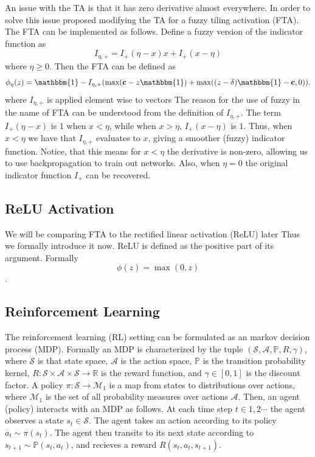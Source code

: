 \documentclass{article}
\newcommand{\RR}{\mathbb{R}}
\newcommand{\PP}{\mathbb{P}}
\newcommand{\cS}{\mathcal{S}}
\newcommand{\cA}{\mathcal{A}}
\newcommand{\cM}{\mathcal{M}}
\begin{document}
An issue with the TA is that it has zero derivative almost everywhere.
In order to solve this issue \cite{pan2019fuzzy} proposed modifying the TA for a fuzzy tiling activation (FTA).
The FTA can be implemented as follows.
Define a fuzzy version of the indicator function as 
$$I_{\eta, +} = I_+(\eta -x)x + I_+(x - \eta)$$
where $\eta \ge 0$.
Then the FTA can be defined as
$$\phi_\eta(z) = \mathbbm{1} - I_{\eta, +} (\max(\mathbf{c} - z \mathbbm{1}) + \max((z-\delta)\mathbbm{1} - \mathbf{c}, 0)).$$
where $I_{\eta, +}$ is applied element wise to vectors
The reason for the use of fuzzy in the name of FTA can be understood from the definition of $I_{\eta, +}$.
The term $I_+(\eta -x)$ is $1$ when $x < \eta$, while when $x > \eta$, $I_+(x - \eta)$ is $1$.
Thus, when $x < \eta$ we have that $I_{\eta ,+}$ evaluates to $x$, giving a smoother (fuzzy) indicator function.
Notice, that this means for $x < \eta$ the derivative is non-zero, allowing us to use backpropagation to train out networks.
Also, when $\eta = 0$ the original indicator function $I_+$ can be recovered.

\subsection{ReLU Activation}
We will be comparing FTA to the rectified linear activation (ReLU) later 
Thus we formally introduce it now.
ReLU is defined as the positive part of its argument. Formally
$$\phi(z) = \max(0, z)$$.

\subsection{Reinforcement Learning} \label{sub-sec:reinforcement}
The reinforcement learning (RL) setting can be formulated as an markov decision process (MDP).
Formally an MDP is characterized by the tuple $(\cS, \cA, \PP, R, \gamma)$, where $\cS$ is that state space, $\cA$ is the action space,
$\PP$ is the transition probability kernel, $R: \cS \times \cA \times \cS \to \RR$ is the reward function, and $\gamma \in [0, 1]$ is the discount factor.
A policy $\pi: \cS \to \cM_1$ is a map from states to distributions over actions, where $\cM_1$ is the set of all probability measures over actions $\cA$.
Then, an agent (policy) interacts with an MDP as follows.
At each time step $t \in 1, 2 \cdots$ the agent observes a state $s_t \in \cS$.
The agent takes an action according to its policy $a_t \sim \pi(s_t)$.
The agent then transits to its next state according to $s_{t+1} \sim \PP(s_t, a_t)$, and recieves a reward $R(s_t, a_t, s_{t+1})$.
\end{document}
